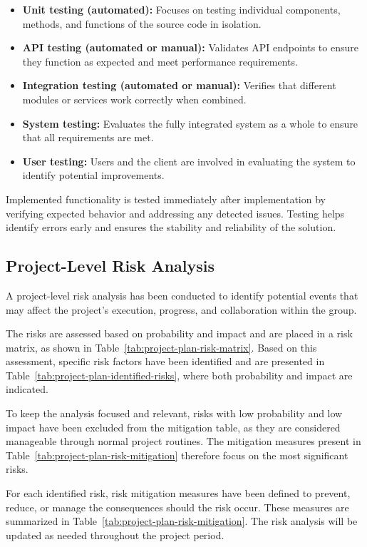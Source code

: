 \begin{itemize}
    \item \textbf{Unit testing (automated):} Focuses on testing individual components, methods, and functions of the source code in isolation.
    \item \textbf{API testing (automated or manual):} Validates API endpoints to ensure they function as expected and meet performance requirements.
    \item \textbf{Integration testing (automated or manual):} Verifies that different modules or services work correctly when combined.
    \item \textbf{System testing:} Evaluates the fully integrated system as a whole to ensure that all requirements are met.
    \item \textbf{User testing:} Users and the client are involved in evaluating the system to identify potential improvements.
\end{itemize}

Implemented functionality is tested immediately after implementation by verifying expected behavior and addressing any detected issues. Testing helps identify errors early and ensures the stability and reliability of the solution.

\subsection{Project-Level Risk Analysis}

A project-level risk analysis has been conducted to identify potential events that may affect the project's execution, progress, and collaboration within the group.

The risks are assessed based on probability and impact and are placed in a risk matrix, as shown in Table~\ref{tab:project-plan-risk-matrix}. Based on this assessment, specific risk factors have been identified and are presented in Table~\ref{tab:project-plan-identified-risks}, where both probability and impact are indicated.

To keep the analysis focused and relevant, risks with low probability and low impact have been excluded from the mitigation table, as they are considered manageable through normal project routines. The mitigation measures present in Table~\ref{tab:project-plan-risk-mitigation} therefore focus on the most significant risks.

For each identified risk, risk mitigation measures have been defined to prevent, reduce, or manage the consequences should the risk occur. These measures are summarized in Table~\ref{tab:project-plan-risk-mitigation}. The risk analysis will be updated as needed throughout the project period.

